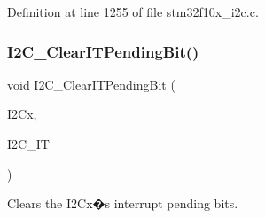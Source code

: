 Definition at line 1255 of file stm32f10x\+\_\+i2c.\+c.

\mbox{\label{group___i2_c___exported___functions_ga110dda440fa200b5f77349df19b3e6bb}} 
\subsubsection{\texorpdfstring{I2\+C\+\_\+\+Clear\+I\+T\+Pending\+Bit()}{I2C\_ClearITPendingBit()}}
{\footnotesize\ttfamily void I2\+C\+\_\+\+Clear\+I\+T\+Pending\+Bit (\begin{DoxyParamCaption}\item[{\hyperlink{struct_i2_c___type_def}{I2\+C\+\_\+\+Type\+Def} $\ast$}]{I2\+Cx,  }\item[{uint32\+\_\+t}]{I2\+C\+\_\+\+IT }\end{DoxyParamCaption})}



Clears the I2\+Cx�s interrupt pending bits. 


